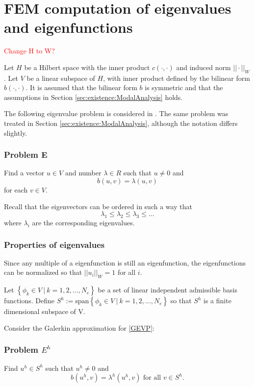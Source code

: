 \documentclass[../../main.tex]{subfiles}
\begin{document}
\section{FEM computation of eigenvalues and eigenfunctions}
\textcolor{red}{Change H to W?}

Let $H$ be a Hilbert space with the inner product $c(\cdot,\cdot)$ and induced norm $||\cdot||_{W}$. Let $V$ be a linear subspace of $H$, with inner product defined by the bilinear form $b(\cdot,\cdot)$. It is assumed that the bilinear form $b$ is symmetric and that the assumptions in Section \ref{sec:existence:ModalAnalysis} holds.

The following eigenvalue problem is considered in \cite{SF73}. The same problem was treated in Section \ref{sec:existence:ModalAnalysis}, although the notation differs slightly.


\subsubsection*{Problem E}
Find a vector $u \in V$ and number $\lambda \in R$ such that $u \neq 0$ and
\begin{equation}
	b(u,v) = \lambda (u,v) \label{GEVP}
\end{equation} for each $v \in V$.

Recall that the eigenvectors can be ordered in such a way that \[\lambda_1 \leq \lambda_2 \leq \lambda_3 \leq ...\] where $\lambda_i$ are the corresponding eigenvalues.

\subsubsection*{Properties of eigenvalues}
Since any multiple of a eigenfunction is still an eigenfunction, the eigenfunctions can be normalized so that $||u_i||_{W} = 1$ for all $i$.

Let $\left\{ \phi_k \in V \ | \  k = 1,2,...,N_e \right\}$ be a set of linear independent admissible basis functions. Define $S^h := \text{span}\left\{\phi_k \in V \ | \ k = 1,2,...,N_e\right\}$ so that $S^h$ is a finite dimensional subspace of V. \label{sym:natural} \label{sym:Sh1}

Consider the Galerkin approximation for \eqref{GEVP}:
\subsubsection*{Problem $E^h$}
Find $u^h \in S^h$ such that $u^h \neq 0$ and \[b(u^h, v) = \lambda^h(u^h,v) \textrm{ for all } v \in S^h.\] 
\end{document}
